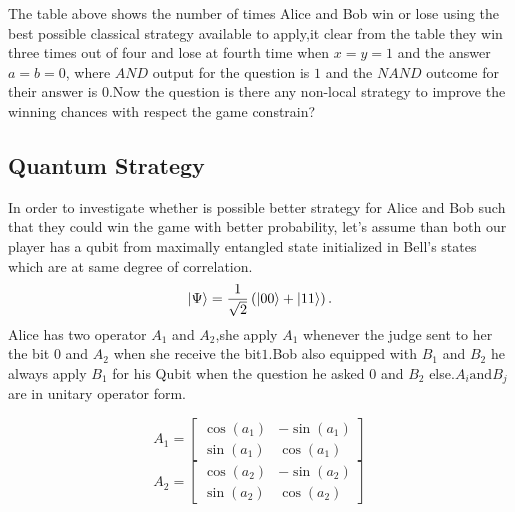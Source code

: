 The table above shows the number of times Alice and Bob win or lose using the best possible  classical strategy available to apply,it clear from the table they win three times out of four and lose at fourth time when $x=y=1$ and the answer $a=b=0$, where $AND$ output for the question is $1$ and the $NAND$ outcome for their answer is $0$.Now the question is there any non-local  strategy  to improve the winning chances with respect the game constrain?

\subsection{Quantum Strategy}
In order to investigate whether is possible better strategy for Alice and Bob such that they could  win the game with better probability, let's assume  than both our player has a qubit from maximally  entangled state initialized in Bell's states which are  at same degree of correlation.
\begin{equation}
\ket{\Psi }= \frac{1}{\sqrt{2}}\left( \ket{00} +\ket{11} \right)\label{EQ:1} .
\end{equation}
Alice has two operator $A_1$ and $A_2$,she apply $A_1$ whenever the judge sent to her the bit $0$ and $A_2$ when she receive the bit$1$.Bob also equipped with $B_1$ and $B_2$ he always apply $B_1$ for his Qubit when the question he asked $0$ and $B_2$ else.$A_i \text{and} B_j$ are in unitary operator form.

\[
A_1=
  \begin{bmatrix}
   \cos(a_1) & -\sin(a_1)\\
   \sin(a_1) & \cos(a_1)
  \end{bmatrix}
\]
\[
A_2=
  \begin{bmatrix}
   \cos(a_2) & -\sin(a_2)\\
   \sin(a_2) & \cos(a_2)
  \end{bmatrix}
\]

